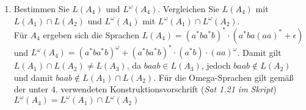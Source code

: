 \documentclass[a4paper]{scrartcl}
\begin{document}
\begin{enumerate}[1.]
    \item Bestimmen Sie $L(A_4)$ und $L^{\omega}(A_4)$. Vergleichen Sie $L(A_4)$ mit 
        $L(A_1) \cap L(A_2)$ und $L^{\omega}(A_4)$ mit $L^{\omega}(A_1) \cap L^{\omega}(A_2)$. \\
        \newline
        Für $A_4$ ergeben sich die Sprachen $L(A_4) = (a^* b a^* b)^* \cdot (a^* b a (aa)^* + \epsilon)$ und $L^\omega (A_4) = (a^* b a^* b)^\omega + (a^* b a^* b)^* \cdot (a^*b) \cdot (aa)^\omega$. Damit gilt $L(A_1)\cap L(A_2)\neq L(A_3)$, da $baab\in L(A_3)$, jedoch $baab\notin L(A_2)$ und damit $baab\notin L(A_1)\cap L(A_2)$. Für die Omega-Sprachen gilt gemäß der unter 4. verwendeten Konstruktionsvorschrift (\textit{Sat 1.21 im Skript}) $L^{\omega}(A_4)=L^{\omega}(A_1)\cap L^{\omega}(A_2)$

\end{enumerate}
\end{document}
